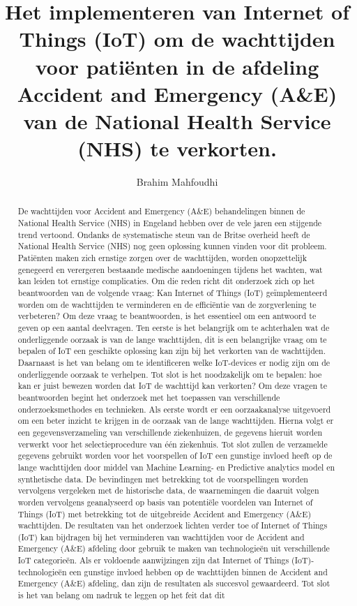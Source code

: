 \documentclass{hogent-article}
\title{Het implementeren van Internet of Things (IoT) om de wachttijden voor patiënten in de afdeling Accident and Emergency (A\&E) van de National Health Service (NHS) te verkorten.}
\author{Brahim Mahfoudhi}
\begin{document}
\begin{abstract}
De wachttijden voor Accident and Emergency (A\&E) behandelingen binnen de National Health Service (NHS) in Engeland hebben over de vele jaren een stijgende trend vertoond. Ondanks de systematische steun van de Britse overheid heeft de National Health Service (NHS) nog geen oplossing kunnen vinden voor dit probleem. Patiënten maken zich ernstige zorgen over de wachttijden, worden onopzettelijk genegeerd en verergeren bestaande medische aandoeningen tijdens het wachten, wat kan leiden tot ernstige complicaties. Om die reden richt dit onderzoek zich op het beantwoorden van de volgende vraag: Kan Internet of Things (IoT) geïmplementeerd worden om de wachttijden te verminderen en de efficiëntie van de zorgverlening te verbeteren? Om deze vraag te beantwoorden, is het essentieel om een antwoord te geven op een aantal deelvragen. Ten eerste is het belangrijk om te achterhalen wat de onderliggende oorzaak is van de lange wachttijden, dit is een belangrijke vraag om te bepalen of IoT een geschikte oplossing kan zijn bij het verkorten van de wachttijden. Daarnaast is het van belang om te identificeren welke IoT-devices er nodig zijn om de onderliggende oorzaak te verhelpen. Tot slot is het noodzakelijk om te bepalen: hoe kan er juist bewezen worden dat IoT de wachttijd kan verkorten? Om deze vragen te beantwoorden begint het onderzoek met het toepassen van verschillende onderzoeksmethodes en technieken. Als eerste wordt er een oorzaakanalyse uitgevoerd om een beter inzicht te krijgen in de oorzaak van de lange wachttijden. Hierna volgt er een gegevensverzameling van verschillende ziekenhuizen, de gegevens hieruit worden verwerkt voor het selectieprocedure van één ziekenhuis. Tot slot zullen de verzamelde gegevens gebruikt worden voor het voorspellen of IoT een gunstige invloed heeft op de lange wachttijden door middel van Machine Learning- en Predictive analytics model en synthetische data. De bevindingen met betrekking tot de voorspellingen worden vervolgens vergeleken met de historische data, de waarnemingen die daaruit volgen worden vervolgens geanalyseerd op basis van potentiële voordelen van Internet of Things (IoT) met betrekking tot de uitgebreide Accident and Emergency (A\&E) wachttijden. De resultaten van het onderzoek lichten verder toe of Internet of Things (IoT) kan bijdragen bij het verminderen van wachttijden voor de Accident and Emergency (A\&E) afdeling door gebruik te maken van technologieën uit verschillende IoT categorieën. Als er voldoende aanwijzingen zijn dat Internet of Things (IoT)-tech\-no\-lo\-gieën een gunstige invloed hebben op de wachttijden binnen de Accident and Emergency (A\&E) afdeling, dan zijn de resultaten als succesvol gewaardeerd. Tot slot is het van belang om nadruk te leggen op het feit dat dit 
\end{abstract}
\end{document}
